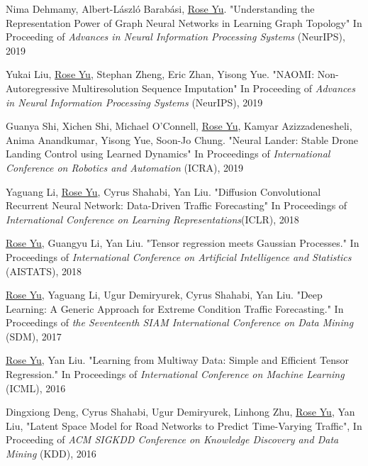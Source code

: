 \documentclass[margin,line]{res}
\begin{document}
\begin{resume}
\begin{enumerate}[label={[C\arabic*]}]
\item Nima Dehmamy, Albert-L\'aszl\'o Barab\'asi, \underline{Rose Yu}.  "Understanding the Representation Power of Graph Neural Networks in Learning Graph Topology" In Proceeding of  \textit{Advances in Neural Information Processing Systems} (NeurIPS), 2019
 
 
\item  Yukai Liu, \underline{Rose Yu}, Stephan Zheng, Eric Zhan, Yisong Yue. "NAOMI: Non-Autoregressive Multiresolution Sequence Imputation" In  Proceeding of  \textit{Advances in Neural Information Processing Systems} (NeurIPS), 2019


\item Guanya Shi, Xichen Shi, Michael O'Connell, \underline{Rose Yu}, Kamyar Azizzadenesheli, Anima Anandkumar, Yisong Yue, Soon-Jo Chung. "Neural Lander: Stable Drone Landing Control using Learned Dynamics" In  Proceedings  of \textit{ International Conference on Robotics and Automation} (ICRA), 2019

\item 	Yaguang Li,  \underline{Rose Yu}, Cyrus Shahabi, Yan Liu. "Diffusion Convolutional Recurrent Neural Network: Data-Driven Traffic Forecasting" In  Proceedings  of   \textit{International Conference on Learning Representations}(ICLR), 2018 
	
\item  \underline{Rose Yu}, Guangyu Li, Yan Liu. "Tensor regression meets Gaussian Processes." In Proceedings  of   \textit{International Conference on Artificial Intelligence and Statistics} (AISTATS), 2018 

\item \underline{Rose Yu}, Yaguang Li, Ugur Demiryurek, Cyrus Shahabi, Yan Liu. "Deep Learning: A Generic Approach for Extreme Condition Traffic Forecasting." In   Proceedings  of  \textit{the Seventeenth SIAM International Conference on Data Mining }(SDM), 2017

\item \underline{Rose Yu}, Yan Liu. "Learning from Multiway Data: Simple and Efficient Tensor Regression." In Proceedings  of  \textit{International Conference on Machine Learning }(ICML),   2016

\item Dingxiong Deng, Cyrus Shahabi, Ugur Demiryurek, Linhong Zhu,  \underline{Rose Yu}, Yan Liu, 
"Latent Space Model for Road Networks to Predict Time-Varying Traffic", In Proceeding of  \textit{ACM SIGKDD Conference on Knowledge Discovery and Data Mining } (KDD), 2016



\end{enumerate}
\end{resume}
\end{document}
